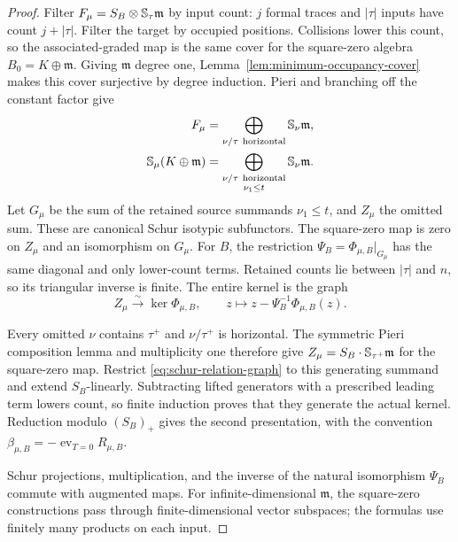 \begin{proof}
Filter $F_\mu=S_B\otimes\mathbb S_\tau\mathfrak m$ by input count:
$j$ formal traces and $|\tau|$ inputs have count $j+|\tau|$.
Filter the target by occupied positions. Collisions lower this count,
so the associated-graded map is the same cover for the square-zero
algebra $B_0=K\oplus\mathfrak m$. Giving $\mathfrak m$ degree one,
Lemma~\ref{lem:minimum-occupancy-cover} makes this cover surjective by
degree induction. Pieri and branching off the constant factor give
\begin{align*}
 F_\mu&=\bigoplus_{\nu/\tau\ \mathrm{horizontal}}\mathbb S_\nu\mathfrak m,\\
 \mathbb S_\mu(K\oplus\mathfrak m)
   &=\bigoplus_{\substack{\nu/\tau\ \mathrm{horizontal}\\\nu_1\le t}}
                                      \mathbb S_\nu\mathfrak m.
\end{align*}
Let $G_\mu$ be the sum of the retained source summands $\nu_1\le t$,
and $Z_\mu$ the omitted sum. These are canonical Schur isotypic
subfunctors. The square-zero map is zero on $Z_\mu$ and an isomorphism
on $G_\mu$. For $B$, the restriction
$\Psi_B=\Phi_{\mu,B}|_{G_\mu}$ has the same diagonal and only
lower-count terms. Retained counts lie between $|\tau|$ and $n$,
so its triangular inverse is finite. The entire kernel is the graph
\begin{equation}\label{eq:schur-relation-graph}
 Z_\mu\xrightarrow{\sim}\ker\Phi_{\mu,B},\qquad
 z\longmapsto z-\Psi_B^{-1}\Phi_{\mu,B}(z).
\end{equation}

Every omitted $\nu$ contains $\tau^+$ and $\nu/\tau^+$ is horizontal.
The symmetric Pieri composition lemma \cite[Lemma~2.1]{SamWeyman}
and multiplicity one therefore give
$Z_\mu=S_B\cdot\mathbb S_{\tau^+}\mathfrak m$ for the square-zero map.
Restrict \eqref{eq:schur-relation-graph} to this generating summand
and extend $S_B$-linearly. Subtracting lifted generators with a prescribed
leading term lowers count, so finite induction proves that they generate
the actual kernel. Reduction modulo $(S_B)_+$ gives the second
presentation, with the convention
$\beta_{\mu,B}=-\operatorname{ev}_{T=0}R_{\mu,B}$.

Schur projections, multiplication, and the inverse of the natural
isomorphism $\Psi_B$ commute with augmented maps. For infinite-dimensional
$\mathfrak m$, the square-zero constructions pass through finite-dimensional
vector subspaces; the formulas use finitely many products on each input.
\end{proof}

